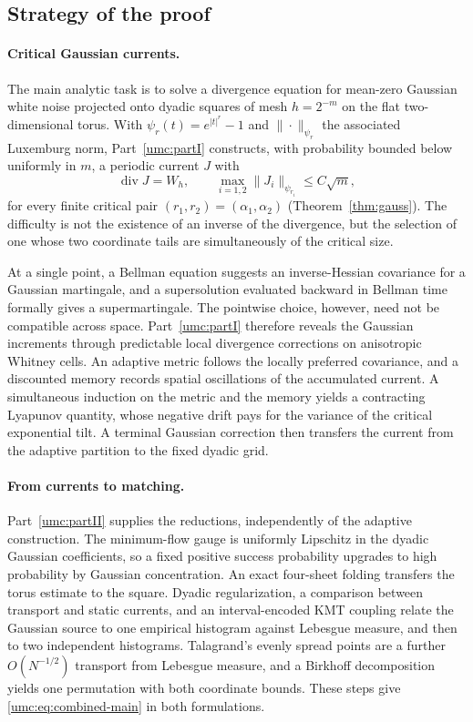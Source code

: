 \documentclass[11pt]{article}
\theoremstyle{definition}
\theoremstyle{remark}
\numberwithin{equation}{section}
\begin{document}
\subsection{Strategy of the proof}

\paragraph{Critical Gaussian currents.}
The main analytic task is to solve a divergence equation for
mean-zero Gaussian white noise projected onto dyadic squares of
mesh $h=2^{-m}$ on the flat two-dimensional torus. With
$\psi_r(t)=e^{|t|^r}-1$ and $\|\cdot\|_{\psi_r}$ the associated
Luxemburg norm, Part~\ref{umc:partI} constructs, with probability
bounded below uniformly in $m$, a periodic current $J$ with
\[
 \operatorname{div}J=W_h,
 \qquad \max_{i=1,2}\|J_i\|_{\psi_{r_i}}\le C\sqrt m,
\]
for every finite critical pair $(r_1,r_2)=(\alpha_1,\alpha_2)$
(Theorem~\ref{thm:gauss}). The difficulty is not the existence of an
inverse of the divergence, but the selection of one whose two
coordinate tails are simultaneously of the critical size.

At a single point, a Bellman equation suggests an inverse-Hessian
covariance for a Gaussian martingale, and a supersolution evaluated
backward in Bellman time formally gives a supermartingale. The
pointwise choice, however, need not be compatible across space.
Part~\ref{umc:partI} therefore reveals the Gaussian increments through
predictable local divergence corrections on anisotropic Whitney cells.
An adaptive metric follows the locally preferred covariance, and a
discounted memory records spatial oscillations of the accumulated
current. A simultaneous induction on the metric and the memory yields a
contracting Lyapunov quantity, whose negative drift pays for the
variance of the critical exponential tilt. A terminal Gaussian
correction then transfers the current from the adaptive partition to
the fixed dyadic grid.

\paragraph{From currents to matching.}
Part~\ref{umc:partII} supplies the reductions, independently of the
adaptive construction. The minimum-flow gauge is uniformly Lipschitz in
the dyadic Gaussian coefficients, so a fixed positive success
probability upgrades to high probability by Gaussian concentration. An
exact four-sheet folding transfers the torus estimate to the square.
Dyadic regularization, a comparison between transport and static
currents, and an interval-encoded KMT coupling relate the Gaussian
source to one empirical histogram against Lebesgue measure, and then to
two independent histograms. Talagrand's evenly spread points are a
further $O(N^{-1/2})$ transport from Lebesgue measure, and a Birkhoff
decomposition yields one permutation with both coordinate bounds. These
steps give \eqref{umc:eq:combined-main} in both formulations.
\end{document}
